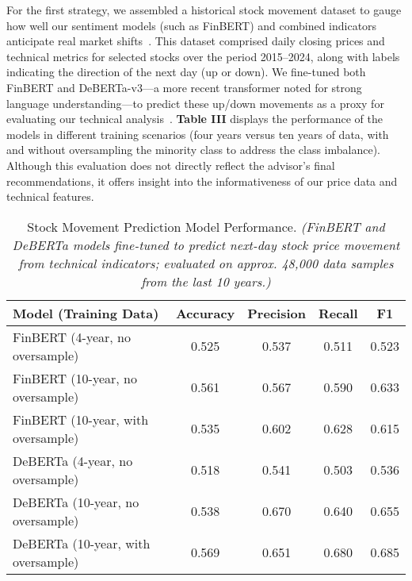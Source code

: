 \documentclass[conference]{IEEEtran}
\begin{document}
For the first strategy, we assembled a historical stock movement dataset to gauge how well our sentiment models (such as FinBERT) and combined indicators anticipate real market shifts~\cite{finbert2020, brown2020}. This dataset comprised daily closing prices and technical metrics for selected stocks over the period 2015--2024, along with labels indicating the direction of the next day (up or down). We fine-tuned both FinBERT and DeBERTa-v3—a more recent transformer noted for strong language understanding—to predict these up/down movements as a proxy for evaluating our technical analysis~\cite{deepfinance2021}. \textbf{Table III} displays the performance of the models in different training scenarios (four years versus ten years of data, with and without oversampling the minority class to address the class imbalance). Although this evaluation does not directly reflect the advisor’s final recommendations, it offers insight into the informativeness of our price data and technical features.


\begin{table*}[htbp]
\centering
\small %
\renewcommand{\arraystretch}{1.3} %
\caption{Stock Movement Prediction Model Performance. \textit{(FinBERT and DeBERTa models fine-tuned to predict next-day stock price movement from technical indicators; evaluated on approx. 48,000 data samples from the last 10 years.)}}
\label{tab:stock-movement-prediction-model-performance}
\begin{tabular}{|l|c|c|c|c|}
\hline
\textbf{Model (Training Data)} & \textbf{Accuracy} & \textbf{Precision} & \textbf{Recall} & \textbf{F1} \\
\hline
FinBERT (4-year, no oversample)    & 0.525 & 0.537 & 0.511 & 0.523 \\
FinBERT (10-year, no oversample)   & 0.561 & 0.567 & 0.590 & 0.633 \\
FinBERT (10-year, with oversample) & 0.535 & 0.602 & 0.628 & 0.615 \\
DeBERTa (4-year, no oversample)    & 0.518 & 0.541 & 0.503 & 0.536 \\
DeBERTa (10-year, no oversample)   & 0.538 & 0.670 & 0.640 & 0.655 \\
DeBERTa (10-year, with oversample) & 0.569 & 0.651 & 0.680 & 0.685 \\
\hline
\end{tabular}
\end{table*}
\end{document}
